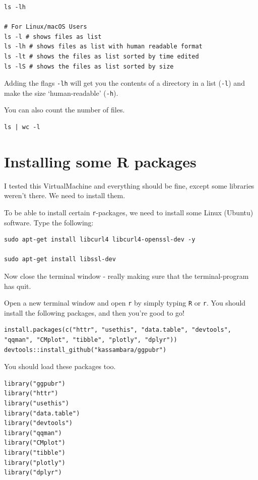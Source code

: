 \documentclass[
]{book}
\begin{document}
\begin{verbatim}
ls -lh

# For Linux/macOS Users
ls -l # shows files as list
ls -lh # shows files as list with human readable format 
ls -lt # shows the files as list sorted by time edited
ls -lS # shows the files as list sorted by size
\end{verbatim}

Adding the flags \texttt{-lh} will get you the contents of a directory in a list (\texttt{-l}) and make the size `human-readable' (\texttt{-h}).

You can also count the number of files.

\begin{verbatim}
ls | wc -l
\end{verbatim}

\hypertarget{installing-some-r-packages}{%
\section{Installing some R packages}\label{installing-some-r-packages}}

I tested this VirtualMachine and everything should be fine, except some libraries weren't there. We need to install them.

To be able to install certain \texttt{r}-packages, we need to install some Linux (Ubuntu) software. Type the following:

\begin{verbatim}
sudo apt-get install libcurl4 libcurl4-openssl-dev -y

sudo apt-get install libssl-dev
\end{verbatim}

Now close the terminal window - really making sure that the terminal-program has quit.

Open a new terminal window and open \texttt{r} by simply typing \texttt{R} or \texttt{r}. You should install the following packages, and then you're good to go!

\begin{verbatim}
install.packages(c("httr", "usethis", "data.table", "devtools", "qqman", "CMplot", "tibble", "plotly", "dplyr"))
devtools::install_github("kassambara/ggpubr")
\end{verbatim}

You should load these packages too.

\begin{verbatim}
library("ggpubr")
library("httr")
library("usethis")
library("data.table")
library("devtools")
library("qqman")
library("CMplot")
library("tibble")
library("plotly")
library("dplyr")
\end{verbatim}
\end{document}
